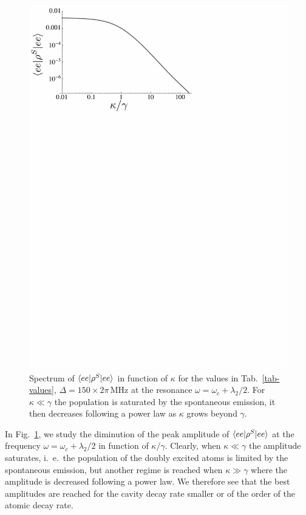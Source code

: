 \begin{figure}
\center
\includegraphics[width=0.65 \textwidth]{Images/chap5/kappa.pdf}
\caption[$\prodsc{ee}{\rho^S}{ee}$ in function of $\kappa$]{ Spectrum of $\prodsc{ee}{\rho^S}{ee}$ in function of $\kappa$ for the values in Tab.~\ref{tab-values}, $\Delta=150 \times 2\pi\,\mbox{MHz}$ at the resonance $\omega=\omega_c+ \lambda_2/2$. For $\kappa\ll \gamma$ the population is saturated by the spontaneous emission, it then decreases following a power law as $\kappa$ grows beyond $\gamma$.}
\label{fig-kappa}
\end{figure}

In Fig.~\ref{fig-kappa}, we study the diminution of the peak amplitude of $\prodsc{ee}{\rho^S}{ee}$ at the frequency $\omega=\omega_c + \lambda_2/2$ in function of $\kappa/\gamma$. Clearly, when $\kappa \ll \gamma$ the amplitude saturates, i.~e.~the population of the doubly excited atoms is limited by the spontaneous emission, but another regime is reached when $\kappa \gg \gamma$ where the amplitude is decreased following a power law. We therefore see that the best amplitudes are reached for the cavity decay rate smaller or of the order of the atomic decay rate.


